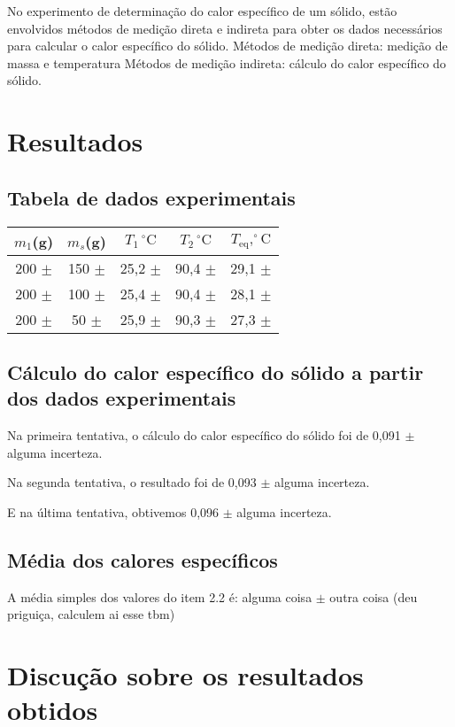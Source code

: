 \documentclass{article}
\begin{document}
\begin{multicols}{2}
No experimento de determinação do calor específico de um sólido, estão envolvidos métodos de medição direta e indireta para obter os dados necessários para calcular o calor específico do sólido.
Métodos de medição direta: medição de massa e temperatura
Métodos de medição indireta: cálculo do calor específico do sólido.

\section{Resultados}
\subsection{Tabela de dados experimentais}

\begin{minipage}{\linewidth}
\centering
\begin{tabular}{|c|c|c|c|c|}
    \hline
    $m_1$(g) & $m_s$(g) & $T_1\,^{\circ}\mathrm{C}$    & $T_2\,^{\circ}\mathrm{C}$ &$T_{\text{eq}},^{\circ}\mathrm{C}$ \\
    \hline
    200 $\pm$ & 150 $\pm$   & 25,2 $\pm$  & 90,4 $\pm$  & 29,1 $\pm$   \\
    \hline
    200 $\pm$  & 100 $\pm$  & 25,4 $\pm$  & 90,4 $\pm$  & 28,1 $\pm$   \\
    \hline
    200 $\pm$ & 50 $\pm$   & 25,9 $\pm$  & 90,3 $\pm$  & 27,3 $\pm$    \\
    \hline
\end{tabular}
\end{minipage}

\subsection{Cálculo do calor específico do sólido a partir dos dados experimentais}

Na primeira tentativa, o cálculo do calor específico do sólido foi de 0,091 $\pm$ alguma incerteza.

Na segunda tentativa, o resultado foi de 0,093 $\pm$ alguma incerteza.

E na última tentativa, obtivemos 0,096 $\pm$ alguma incerteza.

\subsection{Média dos calores específicos}

A média simples dos valores do item 2.2 é: alguma coisa $\pm$ outra coisa (deu priguiça, calculem ai esse tbm)

\section{Discução sobre os resultados obtidos}

\end{multicols}
\end{document}
